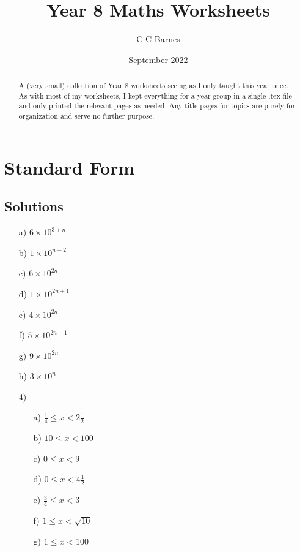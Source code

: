 \documentclass{article}
\title{Year 8 Maths Worksheets}
\author{C C Barnes}
\date{September 2022}
\begin{document}
\maketitle

\begin{abstract}
    A (very small) collection of Year 8 worksheets seeing as I only taught this year once. As with most of my worksheets, I kept everything for a year group in a single .tex file and only printed the relevant pages as needed. Any title pages for topics are purely for organization and serve no further purpose.
\end{abstract}

\tableofcontents

\newpage

\section{Standard Form}

\subsection{Solutions}

\begin{enumerate}
    \item[a)] \(6 \times 10^{3+n}\)
    \item[b)] \(1 \times 10^{n-2}\)
    \item[c)] \(6 \times 10^{2n}\)
    \item[d)] \(1 \times 10^{2n+1}\)
    \item[e)] \(4 \times 10^{2n}\)
    \item[f)] \(5 \times 10^{2n-1}\)
    \item[g)] \(9 \times 10^{2n}\)
    \item[h)] \(3 \times 10^n\)
\end{enumerate}

\begin{enumerate}
    \item [4)] \begin{enumerate}
        \item[a)] \(\frac{1}{4}\leq x < 2\frac{1}{2}\)
        \item[b)] \(10\leq x < 100\)
        \item[c)] \(0\leq x<9\)
        \item[d)] \(0\leq x < 4\frac{1}{2}\)
        \item[e)] \(\frac{3}{4}\leq x < 3\)
        \item[f)] \(1\leq x < \sqrt{10}\)
        \item[g)] \(1 \leq x < 100\)
    \end{enumerate}
\end{enumerate}
\end{document}
